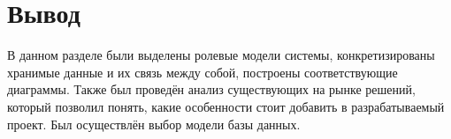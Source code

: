 \section*{Вывод}

В данном разделе были выделены ролевые модели системы, конкретизированы хранимые данные и их связь между собой, построены соответствующие диаграммы. Также был проведён анализ существующих на рынке решений, который позволил понять, какие особенности стоит добавить в разрабатываемый проект. Был осуществлён выбор модели базы данных.